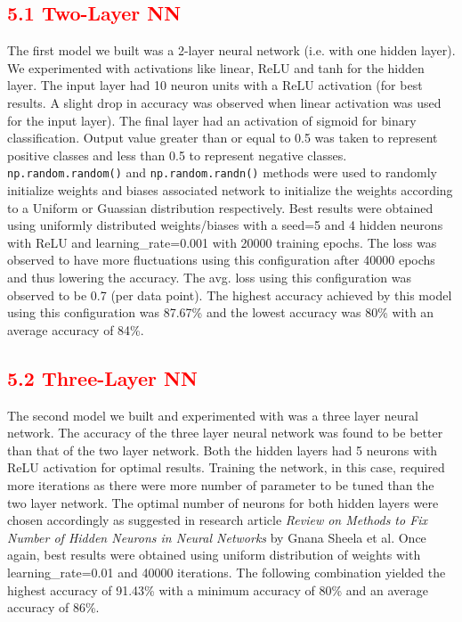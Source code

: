 \documentclass[a4paper,10pt,twoside]{article}
\begin{document}
\subsection*{\textcolor{red}{5.1 Two-Layer NN}}
The first model we built was a 2-layer neural network (i.e. with one hidden layer). We experimented with activations like linear, ReLU and tanh for the hidden layer. The input layer had 10 neuron units with a ReLU activation (for best results. A slight drop in accuracy was observed when linear activation was used for the input layer). The final layer had an activation of sigmoid for binary classification. Output value greater than or equal to 0.5 was taken to represent positive classes and less than 0.5 to represent negative classes.
\texttt{np.random.random()} and \texttt{np.random.randn()} methods were used to randomly initialize weights and biases associated network to initialize the weights according to a Uniform or Guassian distribution respectively. Best results were obtained using uniformly distributed weights/biases with a seed=5 and 4 hidden neurons with ReLU and learning\_rate=0.001 with 20000 training epochs. The loss was observed to have more fluctuations using this configuration after 40000 epochs and thus lowering the accuracy. The avg. loss using this configuration was observed to be 0.7 (per data point). The highest accuracy achieved by this model using this configuration was 87.67\% and the lowest accuracy was 80\% with an average accuracy of 84\%.

\subsection*{\textcolor{red}{5.2 Three-Layer NN}}
The second model we built and experimented with was a three layer neural network. The accuracy of the three layer neural network was found to be better than that of the two layer network. Both the hidden layers had 5 neurons with ReLU activation for optimal results. Training the network, in this case, required more iterations as there were more number of parameter to be tuned than the two layer network. The optimal number of neurons for both hidden layers were chosen accordingly as suggested in research article \textit{Review on Methods to Fix Number of Hidden Neurons in Neural Networks} by Gnana Sheela et al. Once again, best results were obtained using uniform distribution of weights with learning\_rate=0.01 and 40000 iterations. The following combination yielded the highest accuracy of 91.43\% with a minimum accuracy of 80\% and an average accuracy of 86\%.
\end{document}
